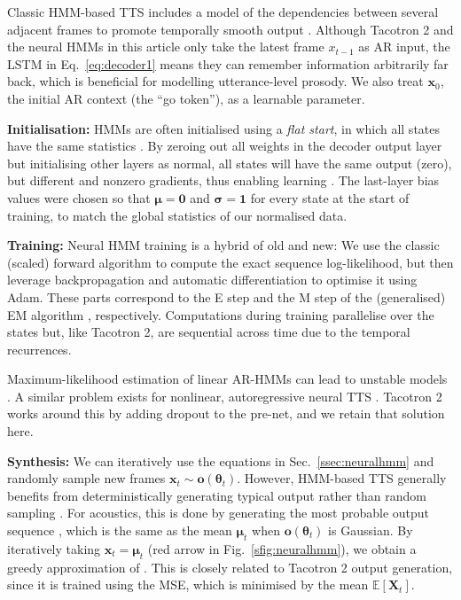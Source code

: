 \documentclass[british]{article}
\newcommand{\bb}[1]{\boldsymbol{#1}}
\newcommand{\x}{\boldsymbol{x}}
\newcommand{\btheta}{\bb{\theta}}
\begin{document}
Classic HMM-based TTS
includes a model of the dependencies between several adjacent frames to promote temporally smooth output \cite{zen2009statistical,shannon2013autoregressive,wu2016merlin}.
Although Tacotron 2 and the neural HMMs in this article only take the latest frame $x_{t-1}$ as AR input, the LSTM in Eq.\ \eqref{eq:decoder1} means they can remember information arbitrarily far back,
which is beneficial for modelling utterance-level prosody.
We also treat $\x_0$, the initial AR context (the ``go token''), as a learnable parameter.

\textbf{Initialisation:}
HMMs are often initialised using a \emph{flat start}, in which all states have the same statistics \cite{young2002htk}.
By zeroing out all weights in the decoder output layer but initialising other layers as normal, all states will have the same output (zero), but different and nonzero gradients, thus enabling learning \cite{zhang2019fixup}.
The last-layer bias values were chosen so that $\bb{\mu}=\bb{0}$ and $\bb{\sigma}=\bb{1}$ for every state at the start of training, to match the global statistics of our normalised data.


\textbf{Training:}
Neural HMM training \cite{tran2016unsupervised} is a hybrid of old and new:
We use the classic (scaled) forward algorithm \cite{rabiner1989tutorial} to compute the exact sequence log-likelihood, but then leverage backpropagation and automatic differentiation to optimise it using Adam.
These parts correspond to the E step and the M step of the (generalised) EM algorithm \cite{dempster1977maximum}, respectively.
Computations during training parallelise over the states but, like Tacotron 2, are sequential across time due to the temporal recurrences.

Maximum-likelihood estimation of linear AR-HMMs can lead to unstable models \cite{quillen2012autoregressive,shannon2013autoregressive}.
A similar problem exists for nonlinear, autoregressive neural TTS \cite{tan2021survey}.
Tacotron 2 works around this by adding dropout to the pre-net, and we retain that solution here.


\textbf{Synthesis:}
We can iteratively use the equations in Sec.\ \ref{ssec:neuralhmm}
and randomly sample new frames $\x_t\sim\bb{o}(\btheta_t)$.
However, HMM-based TTS generally benefits from deterministically generating typical output rather than random sampling \cite{henter2014measuring,henter2016robust}.
For acoustics, this is done by generating the most probable output sequence \cite{tokuda2000speech}, which is the same as the mean $\bb{\mu}_t$ when $\bb{o}(\btheta_t)$ is Gaussian.
By iteratively taking $\x_t=\bb{\mu}_t$ (red arrow in Fig.\ \ref{sfig:neuralhmm}), we obtain a greedy approximation of \cite{tokuda2000speech}.
This is closely related to Tacotron 2 output generation, since it is trained using the MSE, which is minimised by the mean $\mathbb{E}[\bb{X}_t]$.
\end{document}
